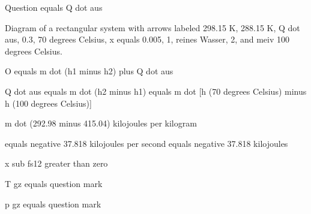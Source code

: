 Question equals Q dot aus

Diagram of a rectangular system with arrows labeled 298.15 K, 288.15 K, Q dot aus, 0.3, 70 degrees Celsius, x equals 0.005, 1, reines Wasser, 2, and meiv 100 degrees Celsius.

O equals m dot (h1 minus h2) plus Q dot aus

Q dot aus equals m dot (h2 minus h1) equals m dot [h (70 degrees Celsius) minus h (100 degrees Celsius)]

m dot (292.98 minus 415.04) kilojoules per kilogram

equals negative 37.818 kilojoules per second equals negative 37.818 kilojoules

x sub fs12 greater than zero

T gz equals question mark

p gz equals question mark